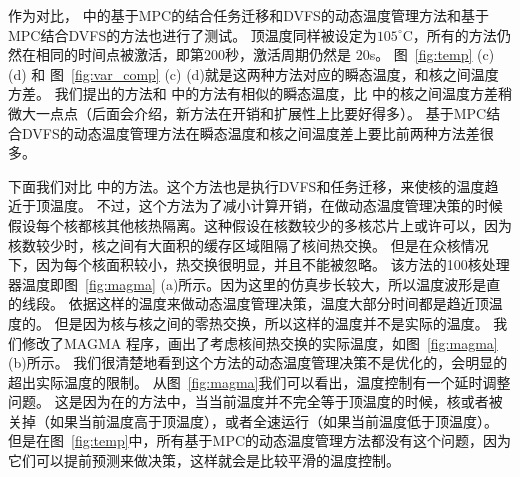 作为对比， \cite{MaWang:APCCAS'14}中的基于MPC的结合任务迁移和DVFS的动态温度管理方法和基于MPC结合DVFS的方法也进行了测试。
顶温度同样被设定为$105^{\circ}$C，所有的方法仍然在相同的时间点被激活，即第200秒，激活周期仍然是 $20$s。
图~\ref{fig:temp} (c) (d) 和 图~\ref{fig:var_comp} (c) (d)就是这两种方法对应的瞬态温度，和核之间温度方差。
我们提出的方法和 \cite{MaWang:APCCAS'14}中的方法有相似的瞬态温度，比 \cite{MaWang:APCCAS'14}中的核之间温度方差稍微大一点点（后面会介绍，新方法在开销和扩展性上比\cite{MaWang:APCCAS'14}要好得多）。
基于MPC结合DVFS的动态温度管理方法在瞬态温度和核之间温度差上要比前两种方法差很多。

下面我们对比 \cite{Hanumaiah:TCAD'11}中的方法。这个方法也是执行DVFS和任务迁移，来使核的温度趋近于顶温度。
不过，这个方法为了减小计算开销，在做动态温度管理决策的时候假设每个核都核其他核热隔离。这种假设在核数较少的多核芯片上或许可以，因为核数较少时，核之间有大面积的缓存区域阻隔了核间热交换。
但是在众核情况下，因为每个核面积较小，热交换很明显，并且不能被忽略。
该方法的100核处理器温度即图~\ref{fig:magma} (a)所示。因为这里的仿真步长较大，所以温度波形是直的线段。
依据这样的温度来做动态温度管理决策，温度大部分时间都是趋近顶温度的。
但是因为核与核之间的零热交换，所以这样的温度并不是实际的温度。
我们修改了MAGMA 程序，画出了考虑核间热交换的实际温度，如图~\ref{fig:magma} (b)所示。
我们很清楚地看到这个方法的动态温度管理决策不是优化的，会明显的超出实际温度的限制。
从图~\ref{fig:magma}我们可以看出，温度控制有一个延时调整问题。
这是因为在\cite{Hanumaiah:TCAD'11}的方法中，当当前温度并不完全等于顶温度的时候，核或者被关掉（如果当前温度高于顶温度），或者全速运行（如果当前温度低于顶温度）。
但是在图~\ref{fig:temp}中，所有基于MPC的动态温度管理方法都没有这个问题，因为它们可以提前预测来做决策，这样就会是比较平滑的温度控制。

